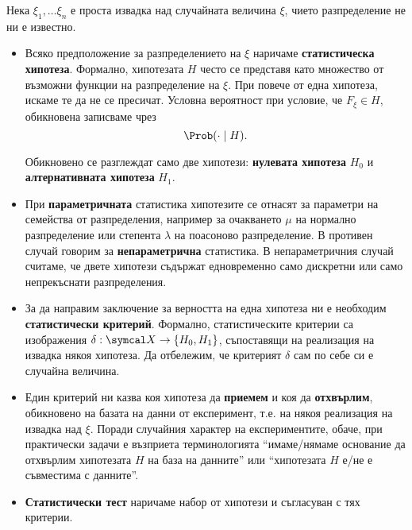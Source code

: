 \documentclass[
  numbers=endperiod,
  headings=standardclasses,
  bibliography=totocnumbered,
]{scrartcl}
\begin{document}
\begin{definition}[Хипотези]
  Нека \( \xi_1, \ldots \xi_n \) е проста извадка над случайната величина \( \xi \), чието разпределение не ни е известно.

  \begin{itemize}
    \item Всяко предположение за разпределението на \( \xi \) наричаме \textbf{статистическа хипотеза}. Формално, хипотезата \( H \) често се представя като множество от възможни функции на разпределение на \( \xi \). При повече от една хипотеза, искаме те да не се пресичат. Условна вероятност при условие, че \( F_\xi \in H \), обикновена записваме чрез
    \begin{equation*}
      \Prob(\cdot \mid H).
    \end{equation*}

    Обикновено се разглеждат само две хипотези: \textbf{нулевата хипотеза} \( H_0 \) и \textbf{алтернативната хипотеза} \( H_1 \).

    \item При \textbf{параметричната} статистика хипотезите се отнасят за параметри на семейства от разпределения, например за очакването \( \mu \) на нормално разпределение или степента \( \lambda \) на поасоново разпределение. В противен случай говорим за \textbf{непараметрична} статистика. В непараметричния случай считаме, че двете хипотези съдържат едновременно само дискретни или само непрекъснати разпределения.

    \item За да направим заключение за верността на една хипотеза ни е необходим \textbf{статистически критерий}. Формално, статистическите критерии са изображения \( \delta: \SampleSpace \to \{ H_0, H_1 \} \), съпоставящи на реализация на извадка някоя хипотеза. Да отбележим, че критерият \( \delta \) сам по себе си е случайна величина.

    \item Един критерий ни казва коя хипотеза да \textbf{приемем} и коя да \textbf{отхвърлим}, обикновено на базата на данни от експеримент, т.е. на някоя реализация на извадка над \( \xi \). Поради случайния характер на експериментите, обаче, при практически задачи е възприета терминологията \enquote{имаме/нямаме основание да отхвърлим хипотезата \( H \) на база на данните} или \enquote{хипотезата \( H \) е/не е съвместима с данните}.

    \item \textbf{Статистически тест} наричаме набор от хипотези и съгласуван с тях критерии.


\end{itemize}
\end{definition}
\end{document}
